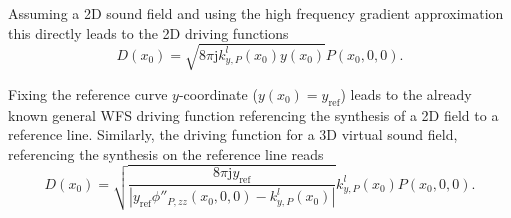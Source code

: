 \documentclass[12pt,a4paper]{article}
\newcommand{\ti}{\mathrm{j}}
\newcommand{\yref}{y_{\mathrm{ref}}}
\begin{document}
Assuming a 2D sound field and using the high frequency gradient approximation this directly leads to the 2D driving functions
\begin{equation}
D(x_0) = 
\sqrt{ 8\pi \ti k^l_{y,P}(x_0) y(x_0) }
 P(x_0,0,0).
\end{equation}

Fixing the reference curve $y$-coordinate ($y(x_0) = \yref$) leads to the already known general WFS driving function referencing the synthesis of a 2D field to a reference line. Similarly, the driving function for a 3D virtual sound field, referencing the synthesis on the reference line reads
\begin{equation}
D(x_0) = 
\sqrt{ \frac{8\pi \ti \yref }{\left| \yref\phi''_{P,zz}(x_0,0,0	) - k^l_{y,P}(x_0) \right|}}
 k^l_{y,P}(x_0)P(x_0,0,0).
\end{equation}
\end{document}
